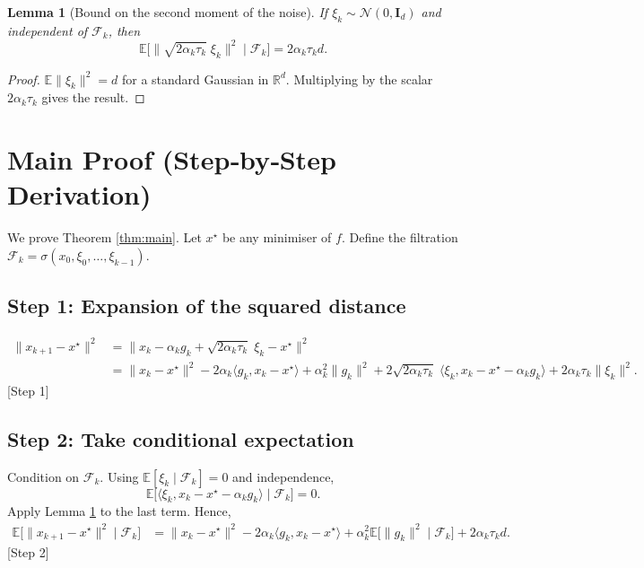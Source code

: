 \documentclass{article}
\newtheorem{lemma}{Lemma}
\newcommand{\E}{\mathbb{E}}
\newcommand{\R}{\mathbb{R}}
\begin{document}
\begin{lemma}[Bound on the second moment of the noise]\label{lem:noise}
If $\xi_{k}\sim\mathcal N(0,\mathbf I_{d})$ and independent of $\mathcal F_{k}$, then
\[
\E\!\big[\|\sqrt{2\alpha_{k}\tau_{k}}\;\xi_{k}\|^{2}\mid\mathcal F_{k}\big]=2\alpha_{k}\tau_{k} d .
\]
\end{lemma}
\begin{proof}
$\E\|\xi_{k}\|^{2}=d$ for a standard Gaussian in $\R^{d}$. Multiplying by the scalar $2\alpha_{k}\tau_{k}$ gives the result. \hfill\qedsymbol
\end{proof}

\section*{Main Proof (Step‑by‑Step Derivation)}
We prove Theorem \ref{thm:main}.  
Let $x^{\star}$ be any minimiser of $f$. Define the filtration $\mathcal F_{k}=\sigma(x_{0},\xi_{0},\dots,\xi_{k-1})$.  

\subsection*{Step 1: Expansion of the squared distance}
\begin{align}
\|x_{k+1}-x^{\star}\|^{2}
&=\big\|x_{k}-\alpha_{k}g_{k}+\sqrt{2\alpha_{k}\tau_{k}}\;\xi_{k}-x^{\star}\big\|^{2}\nonumber\\
&=\|x_{k}-x^{\star}\|^{2}
-2\alpha_{k}\langle g_{k},x_{k}-x^{\star}\rangle
+ \alpha_{k}^{2}\|g_{k}\|^{2}
+2\sqrt{2\alpha_{k}\tau_{k}}\;\langle\xi_{k},x_{k}-x^{\star}-\alpha_{k}g_{k}\rangle
+2\alpha_{k}\tau_{k}\|\xi_{k}\|^{2}. \tag{3}
\end{align}
[Step 1]

\subsection*{Step 2: Take conditional expectation}
Condition on $\mathcal F_{k}$. Using $\E[\xi_{k}\mid\mathcal F_{k}]=0$ and independence,
\[
\E\!\big[\langle\xi_{k},x_{k}-x^{\star}-\alpha_{k}g_{k}\rangle\mid\mathcal F_{k}\big]=0.
\]
Apply Lemma \ref{lem:noise} to the last term. Hence,
\begin{align}
\E\!\big[\|x_{k+1}-x^{\star}\|^{2}\mid\mathcal F_{k}\big]
&=\|x_{k}-x^{\star}\|^{2}
-2\alpha_{k}\langle g_{k},x_{k}-x^{\star}\rangle
+\alpha_{k}^{2}\E\!\big[\|g_{k}\|^{2}\mid\mathcal F_{k}\big]
+2\alpha_{k}\tau_{k}d . \tag{4}
\end{align}
[Step 2]
\end{document}
